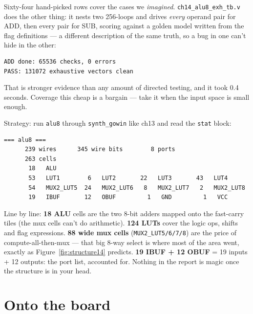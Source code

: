 \begin{example}
Sixty-four hand-picked rows cover the cases we \emph{imagined}.
\texttt{ch14\_alu8\_exh\_tb.v} does the other thing: it nests two
256-loops and drives \emph{every} operand pair for ADD, then every
pair for SUB, scoring against a golden model written from the flag
definitions --- a different description of the same truth, so a bug in
one can't hide in the other:

\begin{lstlisting}[caption={Real run of \ttfamily ch14\_alu8\_exh\_tb.v
--- exhaustive proof for the arithmetic paths.}]
ADD done: 65536 checks, 0 errors
PASS: 131072 exhaustive vectors clean
\end{lstlisting}

That is stronger evidence than any amount of directed testing, and it
took 0.4 seconds. Coverage this cheap is a bargain --- take it when
the input space is small enough.
\end{example}

\begin{example}
Strategy: run \texttt{alu8} through \texttt{synth\_gowin} like ch13
and read the \texttt{stat} block:

\begin{lstlisting}[caption={\ttfamily synth\_gowin stat for
\texttt{alu8} --- real output, trimmed.}]
=== alu8 ===
      239 wires      345 wire bits        8 ports
      263 cells
       18   ALU
       53   LUT1        6   LUT2       22   LUT3       43   LUT4
       54   MUX2_LUT5  24   MUX2_LUT6   8   MUX2_LUT7   2   MUX2_LUT8
       19   IBUF       12   OBUF         1   GND         1   VCC
\end{lstlisting}

Line by line: \textbf{18 ALU} cells are the two 8-bit adders mapped
onto the fast-carry tiles (the mux cells can't do arithmetic).
\textbf{124 LUTs} cover the logic ops, shifts and flag expressions.
\textbf{88 wide mux cells} (\texttt{MUX2\_LUT5/6/7/8}) are the price
of compute-all-then-mux --- that big 8-way select is where most of the
area went, exactly as Figure~\ref{fig:structure14} predicts.
\textbf{19 IBUF + 12 OBUF} = 19 inputs + 12 outputs: the port list,
accounted for. Nothing in the report is magic once the structure is in
your head.
\end{example}

\section{Onto the board}\label{sec:board14}


